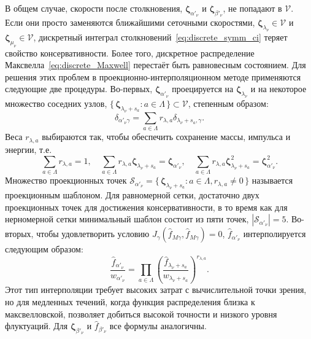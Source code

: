 \documentclass[10pt]{article}
\newcommand{\bzeta}{\boldsymbol{\zeta}}
\newcommand{\Set}[2]{\{\,{#1}:{#2}\,\}}
\begin{document}
В общем случае, скорости после столкновения,
\(\bzeta_{\alpha'_\nu}\) и \(\bzeta_{\beta'_\nu}\), не попадают в \(\mathcal{V}\).
Если они просто заменяются ближайшими сеточными скоростями,
\(\bzeta_{\lambda_\nu}\in\mathcal{V}\) и \(\bzeta_{\mu_\nu}\in\mathcal{V}\),
дискретный интеграл столкновений~\eqref{eq:discrete_symm_ci} теряет свойство консервативности.
Более того, дискретное распределение Максвелла~\eqref{eq:discrete_Maxwell} перестаёт быть равновесным состоянием.
Для решения этих проблем в проекционно-интерполяционном методе применяются следующие две процедуры.
Во-первых, \(\bzeta_{\alpha'_\nu}\) проецируется на \(\bzeta_{\lambda_\nu}\) и
на некоторое множество соседних узлов, \(\Set{\bzeta_{\lambda_\nu+s_a}}{a\in\Lambda}\subset\mathcal{V}\),
степенным образом:
\begin{equation}\label{eq:ci_projection}
    \delta_{\alpha'_\nu\gamma} = \sum_{a\in\Lambda} r_{\lambda,a}\delta_{\lambda_\nu+s_a,\gamma}.
\end{equation}
Веса \(r_{\lambda,a}\) выбираются так, чтобы обеспечить сохранение массы, импульса и энергии, т.е.
\begin{equation}\label{eq:impact_conservation}
    \sum_{a\in\Lambda} r_{\lambda,a} = 1, \quad
    \sum_{a\in\Lambda} r_{\lambda,a} \bzeta_{\lambda_\nu+s_a} = \bzeta_{\alpha'_\nu}, \quad
    \sum_{a\in\Lambda} r_{\lambda,a} \bzeta_{\lambda_\nu+s_a}^2 = \bzeta_{\alpha'_\nu}^2.
\end{equation}
Множество проекционных точек \(\mathcal{S}_{\alpha'_\nu} = \Set{\bzeta_{\lambda_\nu+s_a}}{a\in\Lambda, r_{\lambda,a}\neq0}\)
называется проекционным шаблоном.
Для равномерной сетки, достаточно двух проекционных точек для достижения консервативности,
в то время как для нерномерной сетки минимальный шаблон состоит из пяти точек, \(|\mathcal{S}_{\alpha'_\nu}|=5\).
Во-вторых, чтобы удовлетворить условию \(J_\gamma(\hat{f}_{M\gamma}, \hat{f}_{M\gamma}) = 0\),
\(\hat{f}_{\alpha'_\nu}\) интерполируется следующим образом:
\begin{equation}\label{eq:ci_interpolation}
    \frac{\hat{f}_{\alpha'_\nu}}{w_{\alpha'_\nu}} = \prod_{a\in\Lambda}
        \left(\frac{\hat{f}_{\lambda_\nu+s_a}}{w_{\lambda_\nu+s_a}} \right)^{r_{\lambda,a}}.
\end{equation}
Этот тип интерполяции требует высоких затрат с вычислительной точки зрения,
но для медленных течений, когда функция распределения близка к максвелловской,
позволяет добиться высокой точности и низкого уровня флуктуаций.
Для \(\bzeta_{\beta'_\nu}\) и \(\hat{f}_{\beta'_\nu}\) все формулы аналогичны.
\end{document}
